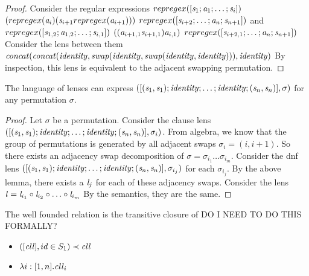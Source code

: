 \begin{lemma}
\begin{proof}
Consider the regular expressions $repregex([\mathit{s}_1;\mathit{a}_1; \ldots;\mathit{s}_i])$ $(repregex(\mathit{a}_i) (\mathit{s}_{i+1} repregex(\mathit{a}_{i+1})))$ $repregex([\mathit{s}_{i+2} ; \ldots ; \mathit{a}_{n} ; \mathit{s}_{n+1}])$ and 
$repregex([\mathit{s}_{1,2};\mathit{a}_{1,2}; \ldots;\mathit{s}_{i,1}])$ $((\mathit{a}_{i+1,1} \mathit{s}_{i+1,1})\mathit{a}_{i,1})$ $repregex([\mathit{s}_{i+2,1} ; \ldots ; \mathit{a}_{n} ; \mathit{s}_{n+1}])$
Consider the lens between them\\ $\mathit{concat}(\mathit{concat}(\mathit{identity},\mathit{swap}(\mathit{identity},\mathit{swap}(\mathit{identity},\mathit{identity}))),\mathit{identity})$
By inspection, this lens is equivalent to the adjacent swapping permutation.
\end{proof}
\end{lemma}

\begin{lemma}
\label{lem:perm-exp}
The language of lenses can express $([(\mathit{s}_1,\mathit{s}_1) ; \mathit{identity} ; \ldots ; \mathit{identity} ; (\mathit{s}_n,\mathit{s}_n)], \sigma)$
for any permutation $\sigma$.
\begin{proof}
Let $\sigma$ be a permutation.
Consider the clause lens $([(\mathit{s}_1,\mathit{s}_1) ; \mathit{identity} ; \ldots ; \mathit{identity} ; (\mathit{s}_n,\mathit{s}_n)], \sigma_{i})$.
From algebra, we know that the group of permutations is generated by all
adjacent swaps $\sigma_i = (i,i+1)$.
So there exists an adjacency swap decomposition of $\sigma = \sigma_{i_1}\ldots\sigma_{i_m}$.
Consider the dnf lens $([(\mathit{s}_1,\mathit{s}_1) ; \mathit{identity} ; \ldots ; \mathit{identity} ; (\mathit{s}_n,\mathit{s}_n)], \sigma_{i_j})$ for each $\sigma_{i_j}$.
By the above lemma, there exists a $\mathit{l}_j$ for each of these adjacency swaps.
Consider the lens $\mathit{l} = \mathit{l}_{i_1} \circ \mathit{l}_{i_2} \circ \ldots  \circ \mathit{l}_{i_m}$
By the semantics, they are the same.

\end{proof}
\end{lemma}

\begin{definition}
The well founded relation is the transitive closure of
DO I NEED TO DO THIS FORMALLY?
\begin{itemize}
\item $([\mathit{cll}],id \in S_1) \prec \mathit{cll}$
\item $\lambda i:[1,n].\mathit{cll}_i$
\end{itemize}
\end{definition}

